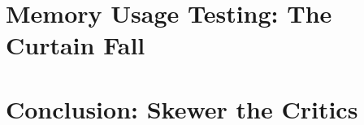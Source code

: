\documentclass[refman]{article}
\theoremstyle{definition}
\begin{document}
	
	\newpage

    
    
    
    
    
    
    
    \section{Memory Usage Testing: The Curtain Fall}
    \section{Conclusion: Skewer the Critics}
\end{document}
